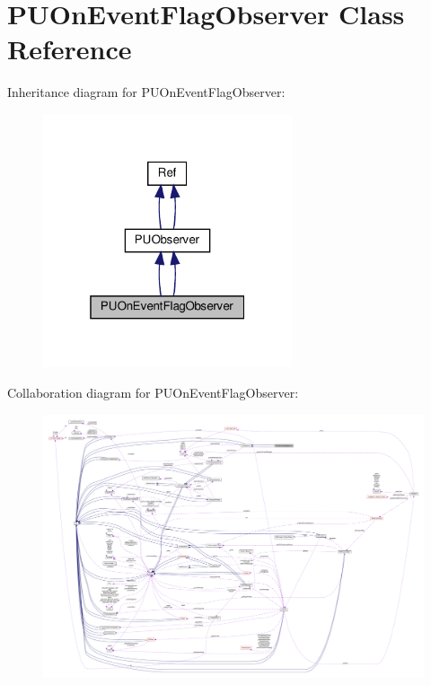 \hypertarget{classPUOnEventFlagObserver}{}\section{P\+U\+On\+Event\+Flag\+Observer Class Reference}
\label{classPUOnEventFlagObserver}


Inheritance diagram for P\+U\+On\+Event\+Flag\+Observer\+:
\nopagebreak
\begin{figure}[H]
\begin{center}
\leavevmode
\includegraphics[width=208pt]{classPUOnEventFlagObserver__inherit__graph}
\end{center}
\end{figure}


Collaboration diagram for P\+U\+On\+Event\+Flag\+Observer\+:
\nopagebreak
\begin{figure}[H]
\begin{center}
\leavevmode
\includegraphics[width=350pt]{classPUOnEventFlagObserver__coll__graph}
\end{center}
\end{figure}
